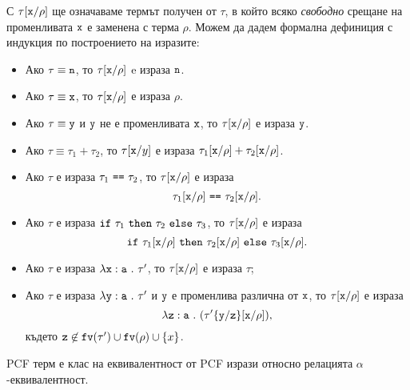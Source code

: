 С $\tau[\texttt{x}/{\rho}]$ ще означаваме термът получен от $\tau$, в който всяко \emph{свободно} срещане на променливата $\texttt{x}$
е заменена с терма $\rho$. Можем да дадем формална дефиниция с индукция по построението на изразите:
\begin{itemize}
\item
  Ако $\tau \equiv \texttt{n}$, то $\tau[\texttt{x}/{\rho}]$ e израза $\texttt{n}$.
\item
  Ако $\tau \equiv \texttt{x}$, то $\tau[\texttt{x}/{\rho}]$ е израза $\rho$.
\item
  Ако $\tau \equiv \texttt{y}$ и $\texttt{y}$ не е променливата $\texttt{x}$, то $\tau[\texttt{x}/{\rho}]$ е израза $\texttt{y}$.
\item
  Ако $\tau \equiv \tau_1 + \tau_2$, то
  $\tau[\texttt{x}/{y}]$ е израза $\tau_1[\texttt{x}/{\rho}] + \tau_2[\texttt{x}/{\rho}]$.
\item
  Ако $\tau$ е израза $\tau_1\ \texttt{==}\ \tau_2$, то $\tau[\texttt{x}/{\rho}]$ е израза
  \[\tau_1\subst{x}{\rho}\ \vv{==}\ \tau_2\subst{x}{\rho}.\]
\item
  Ако $\tau$ е израза $\texttt{if}\ \tau_1\ \texttt{then}\ \tau_2\ \texttt{else}\ \tau_3$, то $\tau[\texttt{x}/{\rho}]$ е израза
  \[\texttt{if}\ \tau_1[\texttt{x}/{\rho}]\ \texttt{then}\ \tau_2[\texttt{x}/{\rho}]\ \texttt{else}\ \tau_3[\texttt{x}/{\rho}].\]
\item
  Ако $\tau$ е израза $\lambda\texttt{x}:\texttt{a}\ .\ {\tau'}$, то
  $\tau[\texttt{x}/{\rho}]$ е израза $\tau$;
\item
  Ако $\tau$ е израза $\lambda\texttt{y}:\texttt{a}\ .\ {\tau'}$ и $\texttt{y}$ е променлива различна от $\texttt{x}$, то
  $\tau[\texttt{x}/{\rho}]$ е израза
  \[\lambda\texttt{z}:\texttt{a}\ .\ {(\tau'\{\texttt{y}/\texttt{z}\}[\texttt{x}/{\rho}])},\]
  където $\texttt{z} \not\in \texttt{fv}(\tau') \cup \texttt{fv}(\rho) \cup \{x\}$.
\end{itemize}



PCF терм е клас на еквивалентност от PCF изрази относно релацията $\alpha$-еквивалентност.

